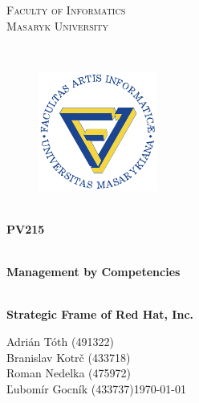 \documentclass[11pt,a4paper]{article}
\begin{document}

\begin{titlepage}

    \begin{center}
        \vfill {%
            \Huge{%
                \textsc{%
                    Faculty of Informatics\\[3mm]%
                    Masaryk University%
                }%
            }%
        }%

        \hfill\\[15mm]

        \begin{figure}[!h]
            \centering
            \includegraphics[scale=3]{muni-fi-logo.pdf}
        \end{figure}

        \hfill\\[10mm]

        \Huge{
            \textbf{
                PV215
            }
        }

        \hfill\\[-10mm]

        \huge{
            \textbf{
                Management by Competencies
            }
        }

        \hfill\\[10mm]

        \LARGE{
            \textbf{
                Strategic Frame of Red Hat, Inc.
            }
        }
        \vfill

    \end{center}

        \Large{
            Adrián Tóth (491322)\\
            Branislav Kotrč (433718)\\
            Roman Nedelka (475972)\\
            Ľubomír Gocník (433737)\hfill \today
        }

\end{titlepage}
\end{document}
